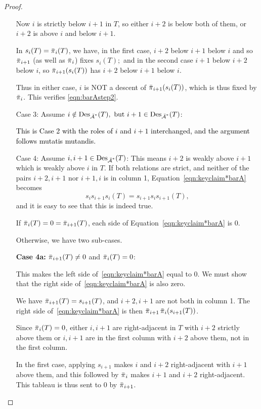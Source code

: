 \documentclass[12pt,letterpaper]{amsart}
\newcommand{\svw}{\textcolor{black}}
\theoremstyle{definition}
\DeclareMathOperator{\Des}{Des}
\begin{document}
\begin{proof}
\begin{enumerate}
Now $i$ is strictly below $i+1$ in $T$, so either $i+2$ is below both of them, or $i+2$ is above $i$ and below $i+1$. 

In $s_i(T)=\operatorname{\bar{\pi}}_i(T)$, we have, in the first case,  $i+2$ below $i+1$ below $i$ and so $\operatorname{\bar{\pi}}_{i+1}$ (as well as  $\operatorname{\bar{\pi}}_i$)  fixes $s_i(T);$ 
and in the second case  $i+1$ below $i+2$ below $i$, so $\operatorname{\bar{\pi}}_{i+1}(s_i(T))$ has $i+2$ below $i+1$ below $i$. 

Thus in either case, $i$ is NOT a descent of $\operatorname{\bar{\pi}}_{i+1}(s_i(T))$, which is thus fixed by $\operatorname{\bar{\pi}}_i$.  This verifies \eqref{eqn:barAstep2}.
\item[Case 3:]  Assume $i\notin \Des_{\bA^*}(T), \text{ but }i+1\in \Des_{\bA^*}(T)$:  

\svw{This is Case 2 with the roles of $i$ and $i+1$ interchanged, and the argument follows mutatis mutandis.}


\item[Case 4:] Assume $i, i+1\in \Des_{\bA^*}(T)$:   This means $i+2$ is weakly above $i+1$ which is weakly above $i$ in $T$.  If both relations are strict, and neither of the pairs $i+2, i+1$ nor $i+1,i$ is in column 1, 
  Equation~\eqref{eqn:keyclaim*barA} becomes 
\begin{equation}\label{eqn:step4bar*} s_i s_{i+1} s_i(T) = s_{i+1} s_i s_{i+1}(T), \end{equation}
and it is easy to see that this is indeed true.  

If $\operatorname{\bar{\pi}}_i(T)=0=\operatorname{\bar{\pi}}_{i+1}(T)$, each side of Equation~\eqref{eqn:keyclaim*barA} is 0.

Otherwise, we have two sub-cases.

\textbf{Case 4a:} $\operatorname{\bar{\pi}}_{i+1}(T)\ne 0$ and  $\operatorname{\bar{\pi}}_i(T)=0$:

This makes the left side of~\eqref{eqn:keyclaim*barA} 
equal to 0.   We must show that the right side of~\eqref{eqn:keyclaim*barA} is also zero.

We have $\operatorname{\bar{\pi}}_{i+1}(T)=s_{i+1}(T)$, and $i+2, i+1$ are not both in column 1.  The right side
 of~\eqref{eqn:keyclaim*barA} is then $\operatorname{\bar{\pi}}_{i+1}\operatorname{\bar{\pi}}_i(s_{i+1}(T))$. 

Since  $\operatorname{\bar{\pi}}_i(T)=0$, either $i, i+1$ are right-adjacent in $T$ with $i+2$ strictly above them 
or $i, i+1$ are in the first column with $i+2$ above them, not in the first column.

In the first case, applying $s_{i+1}$ makes $i$ and $i+2$ right-adjacent with $i+1$ above them, and this followed by $\operatorname{\bar{\pi}}_i$ makes $i+1$ and $i+2$ right-adjacent.  This tableau is thus sent to 0 by  $\operatorname{\bar{\pi}}_{i+1}$.


\end{enumerate}
\end{proof}
\end{document}
